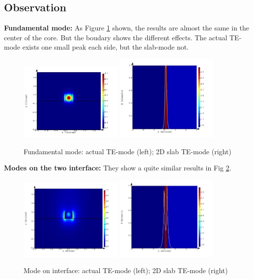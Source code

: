 \documentclass[fontsize=11pt]{scrartcl}
\begin{document}
\subsection{Observation}
\textbf{Fundamental mode:} As Figure \ref{fig1.1} shown, 
the results are almost the same in the center of the core. 
But the boudary shows the different effects. 
The actual TE-mode exists one small peak each side, but the slab-mode not.
\begin{figure}[H]
    \centering
     \includegraphics[width=0.45\textwidth]{img/fig1.1a.jpg} %
     \includegraphics[width=0.45\textwidth]{img/fig1.1b.jpg}
     \caption{Fundamental mode: actual TE-mode (left); 2D slab TE-mode (right)}
     \label{fig1.1}
\end{figure}
\textbf{Modes on the two interface:} They show a quite similar results in Fig \ref{fig1.2}.
\begin{figure}[H]
    \centering
     \includegraphics[width=0.45\textwidth]{img/fig1.2a.jpg} %
     \includegraphics[width=0.45\textwidth]{img/fig1.2b.jpg}
     \caption{Mode on interface: actual TE-mode (left); 2D slab TE-mode (right)}
     \label{fig1.2}
\end{figure} 
\end{document}
